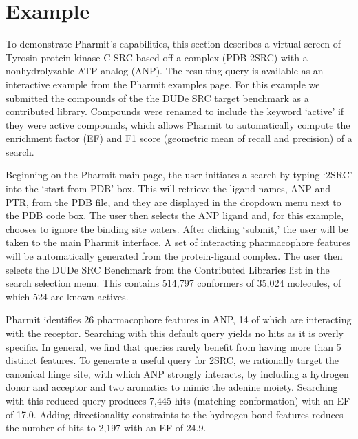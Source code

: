 \section{Example}

To demonstrate Pharmit's capabilities, this section describes a virtual screen of Tyrosin-protein kinase C-SRC based off a complex (PDB 2SRC) with a nonhydrolyzable ATP analog (ANP). The resulting query is available as an interactive example from the Pharmit examples page.  For this example we submitted the compounds of the the DUDe \cite{Mysinger_2012} SRC target benchmark as a contributed library.  Compounds were renamed to include the keyword `active' if they were active compounds, which allows Pharmit to automatically compute the enrichment factor (EF) and F1 score (geometric mean of recall and precision) of a search.

  Beginning on the Pharmit main page, the user initiates a search by typing `2SRC' into the `start from PDB' box. This will retrieve the ligand names, ANP and PTR, from the PDB file, and they are displayed in the dropdown menu next to the PDB code box. The user then selects the ANP ligand and, for this example, chooses to ignore the binding site waters. After clicking `submit,' the user will be taken to the main Pharmit interface. A set of interacting pharmacophore features will be automatically generated from the protein-ligand complex.  The user then selects the DUDe SRC Benchmark from the Contributed Libraries list in the search selection menu.  This contains 514,797 conformers of 35,024 molecules, of which 524 are known actives.
  
  Pharmit identifies 26 pharmacophore features in ANP, 14 of which are interacting with the receptor.  Searching with this default query yields no hits as it is overly specific.  In general, we find that queries rarely benefit from having more than 5 distinct features.
  To generate a useful query for 2SRC, we rationally target the canonical hinge site, with which ANP strongly interacts, by including a hydrogen donor and acceptor and two aromatics to mimic the adenine moiety.  Searching with this reduced query produces 7,445 hits (matching conformation) with an EF of 17.0.  Adding directionality constraints to the hydrogen bond features reduces the number of hits to 2,197 with an EF of 24.9.
  
